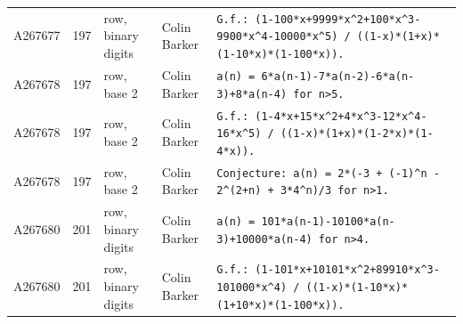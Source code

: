 \documentclass[11pt]{article}
\theoremstyle{definition}
\theoremstyle{remark}
\begin{document}
{\begin{longtable}{p{1.3cm}p{0.7cm}p{2.4cm}p{2.3cm}p{7.3cm}}
A267677 & 197 & row, binary digits & Colin Barker & \texttt{G.f.: \allowbreak{}(1-\allowbreak{}100*\allowbreak{}x+\allowbreak{}9999*\allowbreak{}x\^{}2+\allowbreak{}100*\allowbreak{}x\^{}3-\allowbreak{}9900*\allowbreak{}x\^{}4-\allowbreak{}10000*\allowbreak{}x\^{}5)\allowbreak{} \allowbreak{}/\allowbreak{} \allowbreak{}((1-\allowbreak{}x)\allowbreak{}*\allowbreak{}(1+\allowbreak{}x)\allowbreak{}*\allowbreak{}(1-\allowbreak{}10*\allowbreak{}x)\allowbreak{}*\allowbreak{}(1-\allowbreak{}100*\allowbreak{}x)\allowbreak{})\allowbreak{}.} \\
A267678 & 197 & row, base 2 & Colin Barker & \texttt{a(n)\allowbreak{} \allowbreak{}=\allowbreak{} \allowbreak{}6*\allowbreak{}a(n-\allowbreak{}1)\allowbreak{}-\allowbreak{}7*\allowbreak{}a(n-\allowbreak{}2)\allowbreak{}-\allowbreak{}6*\allowbreak{}a(n-\allowbreak{}3)\allowbreak{}+\allowbreak{}8*\allowbreak{}a(n-\allowbreak{}4)\allowbreak{} \allowbreak{}for \allowbreak{}n>5.} \\
A267678 & 197 & row, base 2 & Colin Barker & \texttt{G.f.: \allowbreak{}(1-\allowbreak{}4*\allowbreak{}x+\allowbreak{}15*\allowbreak{}x\^{}2+\allowbreak{}4*\allowbreak{}x\^{}3-\allowbreak{}12*\allowbreak{}x\^{}4-\allowbreak{}16*\allowbreak{}x\^{}5)\allowbreak{} \allowbreak{}/\allowbreak{} \allowbreak{}((1-\allowbreak{}x)\allowbreak{}*\allowbreak{}(1+\allowbreak{}x)\allowbreak{}*\allowbreak{}(1-\allowbreak{}2*\allowbreak{}x)\allowbreak{}*\allowbreak{}(1-\allowbreak{}4*\allowbreak{}x)\allowbreak{})\allowbreak{}.} \\
A267678 & 197 & row, base 2 & Colin Barker & \texttt{Conjecture: \allowbreak{}a(n)\allowbreak{} \allowbreak{}=\allowbreak{} \allowbreak{}2*\allowbreak{}(-\allowbreak{}3 \allowbreak{}+\allowbreak{} \allowbreak{}(-\allowbreak{}1)\allowbreak{}\^{}n \allowbreak{}-\allowbreak{} \allowbreak{}2\^{}(2+\allowbreak{}n)\allowbreak{} \allowbreak{}+\allowbreak{} \allowbreak{}3*\allowbreak{}4\^{}n)\allowbreak{}/\allowbreak{}3 \allowbreak{}for \allowbreak{}n>1.} \\
A267680 & 201 & row, binary digits & Colin Barker & \texttt{a(n)\allowbreak{} \allowbreak{}=\allowbreak{} \allowbreak{}101*\allowbreak{}a(n-\allowbreak{}1)\allowbreak{}-\allowbreak{}10100*\allowbreak{}a(n-\allowbreak{}3)\allowbreak{}+\allowbreak{}10000*\allowbreak{}a(n-\allowbreak{}4)\allowbreak{} \allowbreak{}for \allowbreak{}n>4.} \\
A267680 & 201 & row, binary digits & Colin Barker & \texttt{G.f.: \allowbreak{}(1-\allowbreak{}101*\allowbreak{}x+\allowbreak{}10101*\allowbreak{}x\^{}2+\allowbreak{}89910*\allowbreak{}x\^{}3-\allowbreak{}101000*\allowbreak{}x\^{}4)\allowbreak{} \allowbreak{}/\allowbreak{} \allowbreak{}((1-\allowbreak{}x)\allowbreak{}*\allowbreak{}(1-\allowbreak{}10*\allowbreak{}x)\allowbreak{}*\allowbreak{}(1+\allowbreak{}10*\allowbreak{}x)\allowbreak{}*\allowbreak{}(1-\allowbreak{}100*\allowbreak{}x)\allowbreak{})\allowbreak{}.} \\

\end{longtable}}
\end{document}
